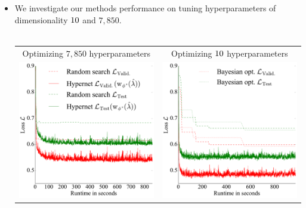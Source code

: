 \documentclass[landscape,a0b,final,a4resizeable]{include/a0poster}
\begin{document}
\begin{poster}
\begin{multicols}{3}
\newcommand{\hyperDimLarge}{7,850}
\begin{itemize}
	\item We investigate our methods performance on tuning hyperparameters of dimensionality $10$ and $\hyperDimLarge$.\\\\
	\begin{tabular}{cc}
	Optimizing $\hyperDimLarge$ hyperparameters & Optimizing $10$ hyperparameters\\
	\includegraphics[width=17cm]{figures/hypernets_local_large.pdf} &
	\includegraphics[width=17cm]{figures/hypernets_local_medium.pdf}
	\end{tabular}
\end{itemize}



\end{multicols}
\end{poster}
\end{document}
